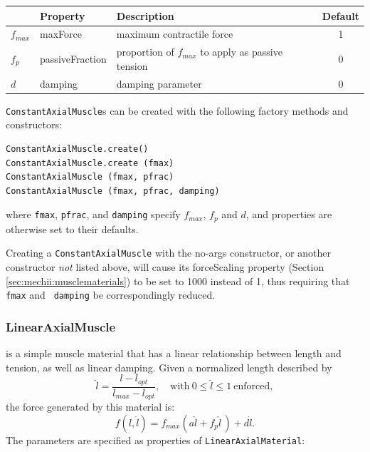 \begin{center}
\begin{tabular}{|l|l|l|c|} \hline
 & Property & Description & Default \\
\hline
$f_{max}$ & {\sf maxForce} & maximum contractile force & 1 \\
$f_{p}$ & {\sf passiveFraction} & 
proportion of $f_{max}$ to apply as passive tension & 0 \\
$d$ & {\sf damping} & damping parameter & 0 \\
\hline
\end{tabular}
\end{center}

{\tt ConstantAxialMuscle}s can be created with the following factory
methods and constructors:
\begin{lstlisting}[]
ConstantAxialMuscle.create()
ConstantAxialMuscle.create (fmax)
ConstantAxialMuscle (fmax, pfrac)
ConstantAxialMuscle (fmax, pfrac, damping)
\end{lstlisting}
%
where {\tt fmax}, {\tt pfrac}, and {\tt damping} specify $f_{max}$, $f_p$
and $d$, and properties are otherwise set to their defaults.

\begin{sideblock}
Creating a {\tt ConstantAxialMuscle} with the no-args constructor, or
another constructor {\it not} listed above, will cause its {\sf
forceScaling} property (Section \ref{sec:mechii:musclematerials}) to
be set to 1000 instead of 1, thus requiring that {\tt fmax} and {\tt
damping} be correspondingly reduced.
\end{sideblock}

\subsubsection{LinearAxialMuscle}

is a simple muscle material that has a linear relationship between
length and tension, as well as linear damping. Given a normalized
length described by
%
\begin{equation}
\hat l= \frac{l - l_{opt}}{l_{max} - l_{opt}}, 
\quad \mathrm{with}~ 0 \le \hat l \le 1~\mathrm{enforced},
\end{equation}
%
the force generated by this material is:
%
\begin{equation}
f(l, \dot l) = f_{max} \left( a \hat l +  f_{p} \hat l \, \right) + d \dot l.
\label{LinearAxialMaterial:eqn}
\end{equation}
%
The parameters are specified as properties of {\tt LinearAxialMaterial}:

